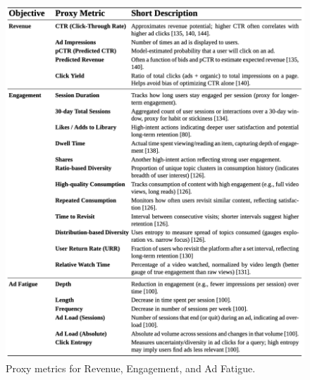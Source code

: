 \documentclass[final]{anthology-ch}         %
\begin{document}

\begin{figure}[ht]
  \centering
  \includegraphics[width=\textwidth, height=0.85\textheight, keepaspectratio]{proxy-metrics-table.png}
  \caption{Proxy metrics for Revenue, Engagement, and Ad Fatigue.}
  \label{fig:proxy-metrics}
\end{figure}
\end{document}
